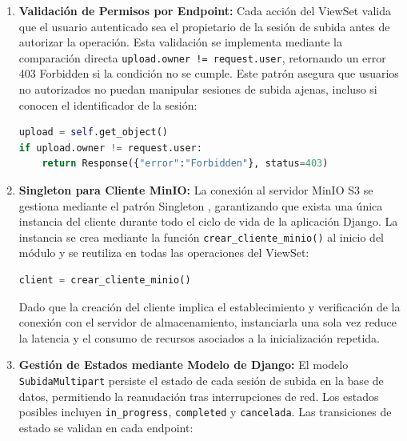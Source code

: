 \begin{enumerate}
\begin{lstlisting}[language=Python, caption={Generación de URLs prefirmadas}]
    return Response({
        "url": url_firmada,
        "method": "PUT",
        "part_number": part_number
    })
\end{lstlisting}

  Este patrón delega la transferencia de bytes pesados directamente entre el navegador y MinIO,
  liberando al servidor Django de actuar como intermediario y reduciendo significativamente la carga
  de CPU y ancho de banda en el backend.

  \item \textbf{Validación de Permisos por Endpoint:} Cada acción del ViewSet valida que el usuario
  autenticado sea el propietario de la sesión de subida antes de autorizar la operación. Esta
  validación se implementa mediante la comparación directa \texttt{upload.owner != request.user},
  retornando un error 403 Forbidden si la condición no se cumple. Este patrón asegura que usuarios
  no autorizados no puedan manipular sesiones de subida ajenas, incluso si conocen el identificador
  de la sesión:

\begin{lstlisting}[language=Python, caption={Validación de permisos}]
upload = self.get_object()
if upload.owner != request.user:
    return Response({"error":"Forbidden"}, status=403)
\end{lstlisting}

  \item \textbf{Singleton para Cliente MinIO:} La conexión al servidor MinIO S3 se gestiona mediante
  el patrón Singleton \citep{Gamma1994}, garantizando que exista una única instancia del cliente durante todo el ciclo
  de vida de la aplicación Django. La instancia se crea mediante la función
  \texttt{crear\_cliente\_minio()} al inicio del módulo y se reutiliza en todas las operaciones del
  ViewSet:

\begin{lstlisting}[language=Python, caption={Instancia singleton del cliente MinIO}]
client = crear_cliente_minio()
\end{lstlisting}

  Dado que la creación del cliente implica el establecimiento y verificación de la conexión con el
  servidor de almacenamiento, instanciarla una sola vez reduce la latencia y el consumo de recursos
  asociados a la inicialización repetida.

  \item \textbf{Gestión de Estados mediante Modelo de Django:} El modelo \texttt{SubidaMultipart}
  persiste el estado de cada sesión de subida en la base de datos, permitiendo la reanudación tras
  interrupciones de red. Los estados posibles incluyen \texttt{in\_progress}, \texttt{completed} y
  \texttt{cancelada}. Las transiciones de estado se validan en cada endpoint:


\end{enumerate}
